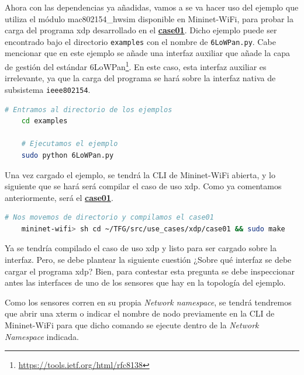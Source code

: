Ahora con las dependencias ya añadidas, vamos a se va hacer uso del ejemplo que utiliza el módulo mac802154\_hwsim disponible en Mininet-WiFi, para probar la carga del programa \gls{xdp} desarrollado en el \href{https://github.com/davidcawork/TFG/tree/master/src/use_cases/xdp/case01}{\textbf{case01}}. Dicho ejemplo puede ser encontrado bajo el directorio \texttt{examples} con el nombre de \texttt{6LoWPan.py}. Cabe mencionar que en este ejemplo se añade una interfaz auxiliar que añade la capa de gestión del estándar 6LoWPan\footnote{\url{https://tools.ietf.org/html/rfc8138}}. En este caso, esta interfaz auxiliar es irrelevante, ya que la carga del programa se hará sobre la interfaz nativa de subsistema \texttt{ieee802154}.

\begin{lstlisting}[language= bash, style=Consola, caption={Ejecución ejemplo 6LoWPan.py},label=code:futureW_run6]
    # Entramos al directorio de los ejemplos
    cd examples
    
    # Ejecutamos el ejemplo
    sudo python 6LoWPan.py
\end{lstlisting}

\vspace{0.5cm}

Una vez cargado el ejemplo, se tendrá la CLI de Mininet-WiFi abierta, y lo siguiente que se hará será compilar el caso de uso \gls{xdp}. Como ya comentamos anteriormente, será el \href{(https://github.com/davidcawork/TFG/tree/master/src/use_cases/xdp/case01}{\textbf{case01}}.

\begin{lstlisting}[language= bash, style=Consola, caption={Compilación del programa XDP - mac802154\_hwsim},label=code:futureW_com6]
    # Nos movemos de directorio y compilamos el case01
    mininet-wifi> sh cd ~/TFG/src/use_cases/xdp/case01 && sudo make

\end{lstlisting}

\vspace{0.5cm}

 Ya se tendría compilado el caso de uso \gls{xdp} y listo para ser cargado sobre la interfaz. Pero, se debe plantear la siguiente cuestión ¿Sobre qué interfaz se debe cargar el programa \gls{xdp}? Bien, para contestar esta pregunta se debe inspeccionar antes las interfaces de uno de los sensores que hay en la topología del ejemplo.\\
 \par
 Como los sensores corren en su propia \textit{Network namespace}, se tendrá tendremos que abrir una xterm o indicar el nombre de nodo previamente en la CLI de Mininet-WiFi para que dicho comando se ejecute dentro de la \textit{Network Namespace} indicada.

